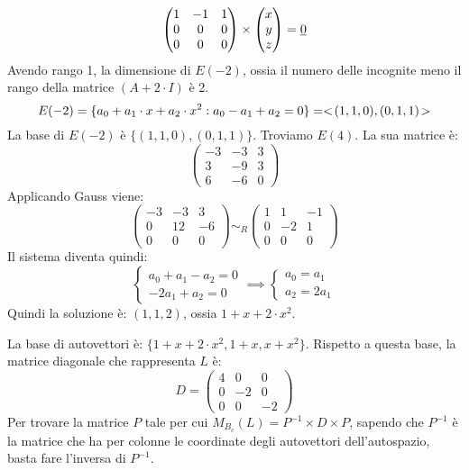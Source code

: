 \begin{exmp}
\[
\begin{pmatrix}
1 & -1 & 1 \\
0 & 0 & 0 \\
0 & 0 & 0
\end{pmatrix}
\times
\begin{pmatrix}
x \\ y \\ z
\end{pmatrix} = \underline{0}
\]
Avendo rango 1, la dimensione di $E(-2)$, ossia il numero delle incognite meno il rango della matrice $(A + 2 \cdot I)$ \`e 2.
\[
E(-2) = \{ a_0 + a_1 \cdot x + a_2 \cdot x^2 : a_0 - a_1 + a_2 = 0 \} =
<\!{(1,1,0),(0,1,1)}\!>
\]
La base di $E(-2)$ \`e $\{ (1,1,0), (0,1,1) \}$. Troviamo $E(4)$. La sua matrice \`e:
\[
\begin{pmatrix}
-3 & -3 & 3 \\
3 & -9 & 3 \\
6 & -6 & 0
\end{pmatrix}
\]
Applicando Gauss viene:
\[
\begin{pmatrix}
-3 & -3 & 3 \\
0 & 12 & -6 \\
0 & 0 & 0
\end{pmatrix}
\sim_R
\begin{pmatrix}
1 & 1 & -1 \\
0 & -2 & 1 \\
0 & 0 & 0
\end{pmatrix}
\]
Il sistema diventa quindi:
\[
\begin{cases}
a_0 + a_1 - a_2 = 0 \\
-2 a_1 + a_2 = 0
\end{cases}
\implies
\begin{cases}
a_0 = a_1 \\
a_2 = 2 a_1
\end{cases}
\]
Quindi la soluzione \`e: $(1, 1, 2)$, ossia $1 + x + 2 \cdot x^2$.

La base di autovettori \`e: $\{ 1 + x + 2 \cdot x^2, 1 + x, x + x^2 \}$. Rispetto a questa base, la matrice diagonale che rappresenta $L$ \`e:
\[
D = 
\begin{pmatrix}
4 & 0 & 0 \\
0 & -2 & 0 \\
0 & 0 & -2
\end{pmatrix}
\]
Per trovare la matrice $P$ tale per cui $M_{B_c} (L) = P^{-1} \times D \times P$, sapendo che $P^{-1}$ \`e la matrice che ha per colonne le coordinate degli autovettori dell'autospazio, basta fare l'inversa di $P^{-1}$.


\end{exmp}
